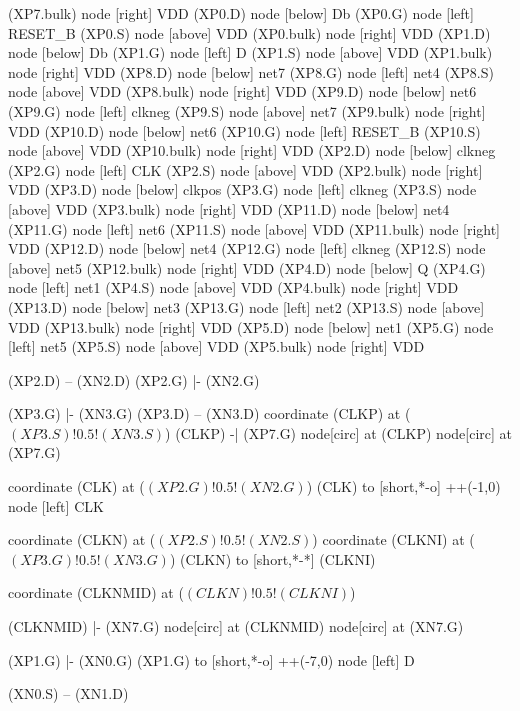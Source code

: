 \begin{circuitikz}[american]
	(XP7.bulk) node [right]	{VDD}
	(XP0.D) node [below]	{Db}
	(XP0.G) node [left]	{RESET\_B}
	(XP0.S) node [above]	{VDD}
	(XP0.bulk) node [right]	{VDD}
	(XP1.D) node [below]	{Db}
	(XP1.G) node [left]	{D}
	(XP1.S) node [above]	{VDD}
	(XP1.bulk) node [right]	{VDD}
	(XP8.D) node [below]	{net7}
	(XP8.G) node [left]	{net4}
	(XP8.S) node [above]	{VDD}
	(XP8.bulk) node [right]	{VDD}
	(XP9.D) node [below]	{net6}
	(XP9.G) node [left]	{clkneg}
	(XP9.S) node [above]	{net7}
	(XP9.bulk) node [right]	{VDD}
	(XP10.D) node [below]	{net6}
	(XP10.G) node [left]	{RESET\_B}
	(XP10.S) node [above]	{VDD}
	(XP10.bulk) node [right]	{VDD}
	(XP2.D) node [below]	{clkneg}
	(XP2.G) node [left]	{CLK}
	(XP2.S) node [above]	{VDD}
	(XP2.bulk) node [right]	{VDD}
	(XP3.D) node [below]	{clkpos}
	(XP3.G) node [left]	{clkneg}
	(XP3.S) node [above]	{VDD}
	(XP3.bulk) node [right]	{VDD}
	(XP11.D) node [below]	{net4}
	(XP11.G) node [left]	{net6}
	(XP11.S) node [above]	{VDD}
	(XP11.bulk) node [right]	{VDD}
	(XP12.D) node [below]	{net4}
	(XP12.G) node [left]	{clkneg}
	(XP12.S) node [above]	{net5}
	(XP12.bulk) node [right]	{VDD}
	(XP4.D) node [below]	{Q}
	(XP4.G) node [left]	{net1}
	(XP4.S) node [above]	{VDD}
	(XP4.bulk) node [right]	{VDD}
	(XP13.D) node [below]	{net3}
	(XP13.G) node [left]	{net2}
	(XP13.S) node [above]	{VDD}
	(XP13.bulk) node [right]	{VDD}
	(XP5.D) node [below]	{net1}
	(XP5.G) node [left]	{net5}
	(XP5.S) node [above]	{VDD}
	(XP5.bulk) node [right]	{VDD}
\fi


	(XP2.D) -- (XN2.D)
	(XP2.G) |- (XN2.G)
	
	(XP3.G) |- (XN3.G)
	(XP3.D) -- (XN3.D)
	coordinate (CLKP) at ($(XP3.S)!0.5!(XN3.S)$)
	(CLKP) -| (XP7.G)
	node[circ] at (CLKP) {}
	node[circ] at (XP7.G) {}
	
	coordinate (CLK) at ($(XP2.G)!0.5!(XN2.G)$)
	(CLK) to [short,*-o] ++(-1,0) node [left] {CLK}
	
	coordinate (CLKN) at ($(XP2.S)!0.5!(XN2.S)$)
	coordinate (CLKNI) at ($(XP3.G)!0.5!(XN3.G)$)
	(CLKN) to [short,*-*] (CLKNI)
	
	coordinate (CLKNMID) at ($(CLKN)!0.5!(CLKNI)$)
	
	(CLKNMID) |- (XN7.G)
	node[circ] at (CLKNMID){}
	node[circ] at (XN7.G){}
	
	(XP1.G) |- (XN0.G)
	(XP1.G) to [short,*-o] ++(-7,0) node [left] {D}
	
	(XN0.S) -- (XN1.D) 
	

\end{circuitikz}
